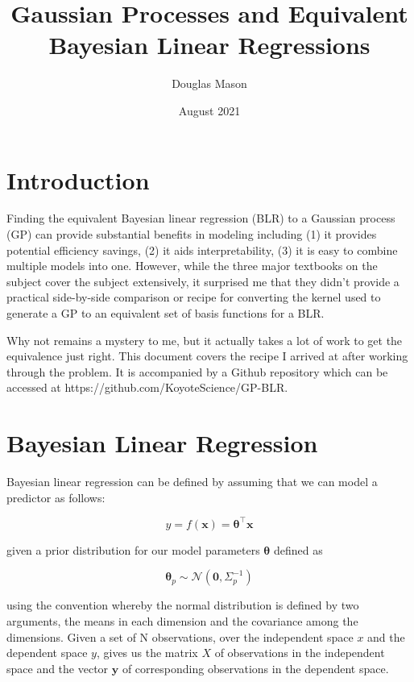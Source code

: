 \documentclass{article}
\title{Gaussian Processes and Equivalent Bayesian Linear Regressions}
\author{Douglas Mason}
\date{August 2021}
\begin{document}
\maketitle

\section{Introduction}

Finding the equivalent Bayesian linear regression (BLR) to a Gaussian process (GP) can provide substantial benefits in modeling including (1) it provides potential efficiency savings, (2) it aids interpretability, (3) it is easy to combine multiple models into one. However, while the three major textbooks on the subject \cite{bishop, murphy, rasmussen} cover the subject extensively, it surprised me that they didn't provide a practical side-by-side comparison or recipe for converting the kernel used to generate a GP to an equivalent set of basis functions for a BLR.

Why not remains a mystery to me, but it actually takes a lot of work to get the equivalence just right. This document covers the recipe I arrived at after working through the problem. It is accompanied by a Github repository which can be accessed at https://github.com/KoyoteScience/GP-BLR.


\section{Bayesian Linear Regression}
Bayesian linear regression can be defined by assuming that we can model a predictor as follows:

\begin{equation}
    y=f(\mathbf{x})=\mathbf{\theta}^\top\mathbf{x}
\end{equation} 

given a prior distribution for our model parameters $\boldsymbol{\theta}$ defined as 

\begin{equation}
    \boldsymbol{\theta}_p \sim \mathcal{N}(\mathbf{0},\Sigma_p^{-1})
\end{equation} 

using the convention whereby the normal distribution is defined by two arguments, the means in each dimension and the covariance among the dimensions. Given a set of N observations, over the independent space $x$ and the dependent space $y$, gives us the matrix $X$ of observations in the independent space and the vector $\mathbf{y}$ of corresponding observations in the dependent space.
\end{document}
